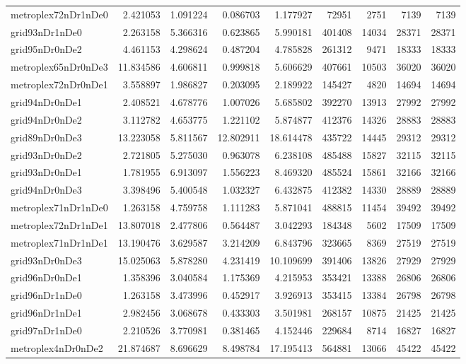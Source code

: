 \begin{longtable}{|l|r|r|r|r|r|r|r|r|}
metroplex72nDr1nDe0 & 2.421053 & 1.091224 & 0.086703 & 1.177927 & 72951 & 2751 & 7139 & 7139 \\
grid93nDr1nDe0 & 2.263158 & 5.366316 & 0.623865 & 5.990181 & 401408 & 14034 & 28371 & 28371 \\
grid95nDr0nDe2 & 4.461153 & 4.298624 & 0.487204 & 4.785828 & 261312 & 9471 & 18333 & 18333 \\
metroplex65nDr0nDe3 & 11.834586 & 4.606811 & 0.999818 & 5.606629 & 407661 & 10503 & 36020 & 36020 \\
metroplex72nDr0nDe1 & 3.558897 & 1.986827 & 0.203095 & 2.189922 & 145427 & 4820 & 14694 & 14694 \\
grid94nDr0nDe1 & 2.408521 & 4.678776 & 1.007026 & 5.685802 & 392270 & 13913 & 27992 & 27992 \\
grid94nDr0nDe2 & 3.112782 & 4.653775 & 1.221102 & 5.874877 & 412376 & 14326 & 28883 & 28883 \\
grid89nDr0nDe3 & 13.223058 & 5.811567 & 12.802911 & 18.614478 & 435722 & 14445 & 29312 & 29312 \\
grid93nDr0nDe2 & 2.721805 & 5.275030 & 0.963078 & 6.238108 & 485488 & 15827 & 32115 & 32115 \\
grid93nDr0nDe1 & 1.781955 & 6.913097 & 1.556223 & 8.469320 & 485524 & 15861 & 32166 & 32166 \\
grid94nDr0nDe3 & 3.398496 & 5.400548 & 1.032327 & 6.432875 & 412382 & 14330 & 28889 & 28889 \\
metroplex71nDr1nDe0 & 1.263158 & 4.759758 & 1.111283 & 5.871041 & 488815 & 11454 & 39492 & 39492 \\
metroplex72nDr1nDe1 & 13.807018 & 2.477806 & 0.564487 & 3.042293 & 184348 & 5602 & 17509 & 17509 \\
metroplex71nDr1nDe1 & 13.190476 & 3.629587 & 3.214209 & 6.843796 & 323665 & 8369 & 27519 & 27519 \\
grid93nDr0nDe3 & 15.025063 & 5.878280 & 4.231419 & 10.109699 & 391406 & 13826 & 27929 & 27929 \\
grid96nDr0nDe1 & 1.358396 & 3.040584 & 1.175369 & 4.215953 & 353421 & 13388 & 26806 & 26806 \\
grid96nDr1nDe0 & 1.263158 & 3.473996 & 0.452917 & 3.926913 & 353415 & 13384 & 26798 & 26798 \\
grid96nDr1nDe1 & 2.982456 & 3.068678 & 0.433303 & 3.501981 & 268157 & 10875 & 21425 & 21425 \\
grid97nDr1nDe0 & 2.210526 & 3.770981 & 0.381465 & 4.152446 & 229684 & 8714 & 16827 & 16827 \\
metroplex4nDr0nDe2 & 21.874687 & 8.696629 & 8.498784 & 17.195413 & 564881 & 13066 & 45422 & 45422 \\

\end{longtable}
